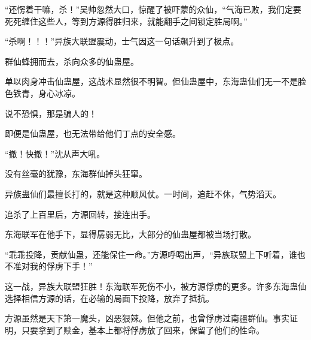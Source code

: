 \begin{this_body}
“还愣着干嘛，杀！”吴帅忽然大口，惊醒了被吓蒙的众仙，“气海已败，我们定要死死缠住这些人，等到方源得胜归来，就能翻手之间锁定胜局啊。”

“杀啊！！！”异族大联盟震动，士气因这一句话飙升到了极点。

群仙蜂拥而去，杀向众多的仙蛊屋。

单以肉身冲击仙蛊屋，这战术显然很不明智。但仙蛊屋中，东海蛊仙们无一不是脸色铁青，身心冰凉。

说不恐惧，那是骗人的！

即便是仙蛊屋，也无法带给他们丁点的安全感。

“撤！快撤！”沈从声大吼。

没有丝毫的犹豫，东海群仙掉头狂窜。

异族蛊仙们最擅长打的，就是这种顺风仗。一时间，追赶不休，气势滔天。

追杀了上百里后，方源回转，接连出手。

东海联军在他手下，显得孱弱无比，大部分的仙蛊屋都被当场打散。

“乖乖投降，贡献仙蛊，还能保住一命。”方源呼喝出声，“异族联盟上下听着，谁也不准对我的俘虏下手！”

这一战，异族大联盟狂胜！东海联军死伤不小，被方源俘虏的更多。许多东海蛊仙选择相信方源的话，在必输的局面下投降，放弃了抵抗。

方源虽然是天下第一魔头，凶恶狠辣。但他之前，也曾俘虏过南疆群仙。事实证明，只要拿到了赎金，基本上都将俘虏放了回来，保留了他们的性命。

\end{this_body}

